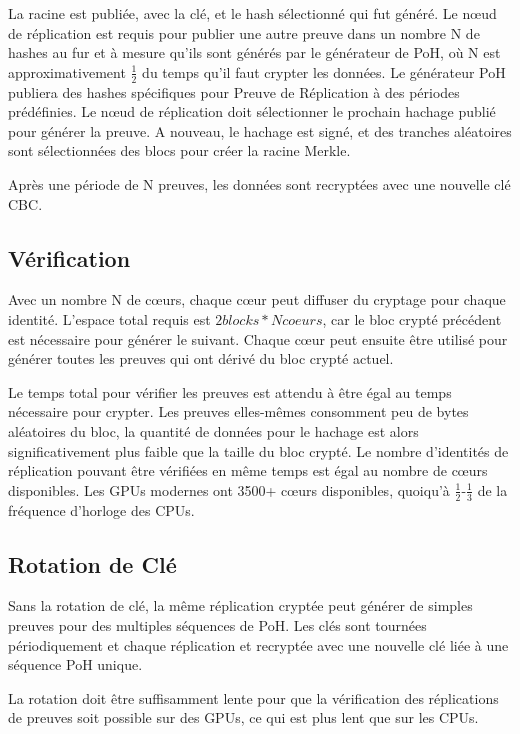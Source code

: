 \documentclass[12pt]{article}
\begin{document}
La racine est publiée, avec la clé, et le hash sélectionné qui fut généré. Le nœud de réplication est requis pour publier une autre preuve dans un nombre N de hashes au fur et à mesure qu’ils sont générés par le générateur de PoH, où N est approximativement \(\frac{1}{2}\) du temps qu’il faut crypter les données. Le générateur PoH publiera des hashes spécifiques pour Preuve de Réplication à des périodes prédéfinies. Le nœud de réplication doit sélectionner le prochain hachage publié pour générer la preuve. A nouveau, le hachage est signé, et des tranches aléatoires sont sélectionnées des blocs pour créer la racine Merkle.

Après une période de N preuves, les données sont recryptées avec une nouvelle clé CBC.
\subsection{Vérification}

Avec un nombre N de cœurs, chaque cœur peut diffuser du cryptage pour chaque identité. L’espace total requis est \(2 blocks * N coeurs\), car le bloc crypté précédent est nécessaire pour générer le suivant. Chaque cœur peut ensuite être utilisé pour générer toutes les preuves qui ont dérivé du bloc crypté actuel.

Le temps total pour vérifier les preuves est attendu à être égal au temps nécessaire pour crypter. Les preuves elles-mêmes consomment peu de bytes aléatoires du bloc, la quantité de données pour le hachage est alors significativement plus faible que la taille du bloc crypté. Le nombre d’identités de réplication pouvant être vérifiées en même temps est égal au nombre de cœurs disponibles. Les GPUs modernes ont 3500+ cœurs disponibles, quoiqu’à \(\frac{1}{2}\)-\(\frac{1}{3}\) de la fréquence d’horloge des CPUs.

\subsection{Rotation de Clé}

Sans la rotation de clé, la même réplication cryptée peut générer de simples preuves pour des multiples séquences de PoH. Les clés sont tournées périodiquement et chaque réplication et recryptée avec une nouvelle clé liée à une séquence PoH unique.

La rotation doit être suffisamment lente pour que la vérification des réplications de preuves soit possible sur des GPUs, ce qui est plus lent que sur les CPUs.
\end{document}
